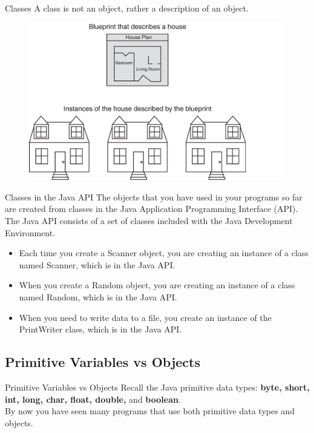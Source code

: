 \documentclass[11pt]{beamer}
\begin{document}
\begin{frame}{Classes}
A class is not an object, rather a description of an object.
    \noindent 
    \begin{figure}[H]
    \centering
    \includegraphics[scale=0.8]{Images/chapter06_BlueprintHouses.png}
    \end{figure}
\end{frame}

\begin{frame}{Classes in the Java API}
    The objects that you have used in your programs so far are created from
    classes in the Java Application Programming Interface (API).
    \\ \vspace{1em}
    The Java API consists of a set of classes included with the Java Development Environment. 
    \\ \vspace{1em}
    \begin{itemize}
        \item Each time you create a Scanner object, you are creating an instance of a class named Scanner, which is in the Java API.
        \item  When you create a Random object, you are creating an instance of a class named Random, which is in the Java API.
        \item When you need to write data to a file, you create an instance of the PrintWriter class, which is in the Java API.
    \end{itemize}
\end{frame}

\subsection{Primitive Variables vs Objects}
\begin{frame}[fragile]{Primitive Variables vs Objects}
    Recall the Java primitive data types: \textbf{byte, short, int, long, char, float, double,} and \textbf{boolean}.
    \\ \vspace{1em}
    By now you have seen many programs that use both primitive data types and objects. 
\end{frame}
\end{document}
